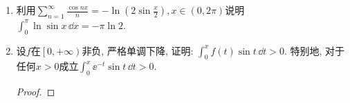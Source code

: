 \begin{a}
\begin{enumerate}
\begin{proof}[解答]
(3)先考虑\(|r|<1\)的情形. 把\(r\)看成参变量, 记
\[I(r)=\int_{0}^{\pi}\ln\left(1-2r\cos x+r^2\right)\dd x\]
并对\(r\)求导, 得到
\[I'(r)=\int_{0}^{\pi}\frac{-2\cos x+2r}{1-2r\cos x+r^2}\,\dd x,\]
由此可得\(I'(0)=-2\int_{0}^{\pi}\cos x\,\dd x=0\). 现设\(r\ne 0\), 则
\begin{align*}
    I'(r)&=\frac{1}{r}\int_{0}^{\pi}\left(1-\frac{1-r^2}{1-2r\cos x+r^2}\right)\dd x\\
    &=\frac{1}{r}\left(\pi-(1-r^2)\int_{0}^{\pi}\frac{\dd x}{1-2r\cos x+r^2}\right),
\end{align*}
做变换\(t=\tan(x/2)\), 可得
\begin{align*}
    &(1-r^2)\int_{0}^{\pi}\frac{\dd x}{1-2r\cos x+r^2}\\
    &=\frac{1+r}{1-r}\int_{0}^{+\infty}\frac{2\dd t}{1+\displaystyle\left(\frac{1+r}{1-r}t\right)^2}\\
    &=\left.2\arctan\frac{1+r}{1-r}t\right|^{+\infty}_0=\pi.\end{align*}
这里用到了\(|r|<1\)的条件, 从而\(I'(r)\equiv 0\), 
易见\(I(0)=0\), 从而\(I(r)\equiv 0\).

在考虑\(|r|>1\)的情形. 令\(\rho=1/r\), 则\(\left|\rho\right|<1\). 于是
\[I(r)=I\left(\frac{1}{\rho}\right)
=\int_{0}^{\pi}\ln\left(1-2\rho\cos x+\rho^2\right)\dd x
-\int_{0}^{\pi}\ln \rho^2\,\dd x=-2\pi\ln|\rho|=2\pi\ln|r|.\]

当\(r=\pm 1\)时, 利用上题结果可知
\[\int_{0}^{\pi/2}\ln\sin x\,\dd x=\int_{0}^{\pi/2}\ln\cos x\,\dd x=-\frac{\pi}{2}\ln 2.\]
可以得到\(I(\pm 1)=0\). 即得\(I(r)=\begin{cases}
0,&|r|\leqslant 1,\\
2\pi\ln|r|,\quad&|r|>1.
\end{cases}\)

(4)易见\(\int_{0}^{+\infty}\ee^{-(x^2+1/x^2)}\,\dd x\)收敛, 置\(x=\frac{1}{t}\)得到
\[\int_{0}^{+\infty}\ee^{-(x^2+1/x^2)}\,\dd x
=\int_{0}^{+\infty}\frac{1}{t^2}\ee^{-(t^2+1/t^2)}\,\dd t,\]
于是有\[\begin{split}
\frac{1}{2}\int_{0}^{+\infty}\ee^{-(x^2+1/x^2)}
&=\frac{1}{2}\int_{0}^{+\infty}\ee^{-\left((x-\frac{1}{x})^2+2\right)}\left(1+\frac{1}{x^2}\right)\dd x\\
&=\frac{1}{2}\int_{0}^{+\infty}\ee^{-\left((x-\frac{1}{x})^2+2\right)}\dd\left(x-\frac{1}{x}\right)\\
&=\frac{1}{2}\int_{-\infty}^{+\infty}\ee^{-t^2-2}\,\dd t=\frac{\sqrt{\pi}}{2\ee^2}.
\end{split}\]
\end{proof}
\item 利用\(\sum_{n=1}^{\infty}\frac{\cos nx}{n}=-\ln\left(2\sin\frac{x}{2}\right),x\in\left(0,2\pi\right)\)说明\(\int_{0}^{\pi}\ln\sin x\,\dd x=-\pi\ln 2.\)
\item 设\(f\)在\(\left[0,+\infty\right)\)非负, 严格单调下降, 
证明: \(\int_{0}^{x}f(t)\sin t\,\dd t>0\). 
特别地, 对于任何\(x>0\)成立\(\int_{0}^{x}\ee^{-t}\sin t\,\dd t>0\).
\begin{proof}
	

\end{proof}
\end{enumerate}
\end{a}
